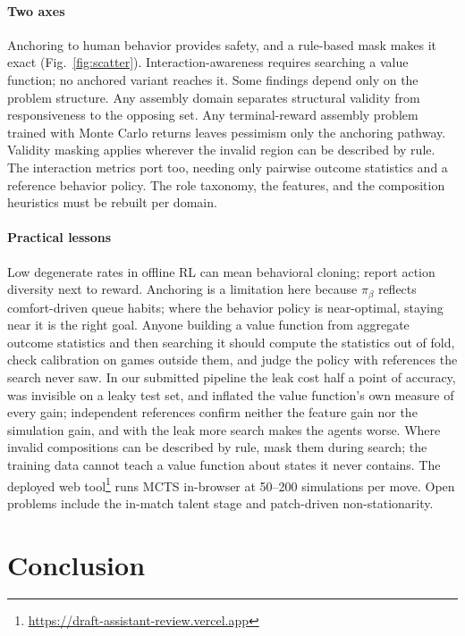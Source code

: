 \documentclass[journal]{IEEEtran}
\newcommand{\deployurl}{\url{https://draft-assistant-review.vercel.app}}
\newcommand{\deployurl}{\url{https://www.hotsfever.com}}
\begin{document}
\paragraph{Two axes} Anchoring to human behavior provides safety, and a rule-based mask makes it exact (Fig.~\ref{fig:scatter}). Interaction-awareness requires searching a value function; no anchored variant reaches it. Some findings depend only on the problem structure. Any assembly domain separates structural validity from responsiveness to the opposing set. Any terminal-reward assembly problem trained with Monte Carlo returns leaves pessimism only the anchoring pathway. Validity masking applies wherever the invalid region can be described by rule. The interaction metrics port too, needing only pairwise outcome statistics and a reference behavior policy. The role taxonomy, the features, and the composition heuristics must be rebuilt per domain.

\paragraph{Practical lessons} Low degenerate rates in offline RL can mean behavioral cloning; report action diversity next to reward. Anchoring is a limitation here because $\pi_\beta$ reflects comfort-driven queue habits; where the behavior policy is near-optimal, staying near it is the right goal. Anyone building a value function from aggregate outcome statistics and then searching it should compute the statistics out of fold, check calibration on games outside them, and judge the policy with references the search never saw. In our submitted pipeline the leak cost half a point of accuracy, was invisible on a leaky test set, and inflated the value function's own measure of every gain; independent references confirm neither the feature gain nor the simulation gain, and with the leak more search makes the agents worse. Where invalid compositions can be described by rule, mask them during search; the training data cannot teach a value function about states it never contains. The deployed web tool\footnote{\deployurl} runs MCTS in-browser at 50--200 simulations per move. Open problems include the in-match talent stage and patch-driven non-stationarity.

\section{Conclusion}
\end{document}
